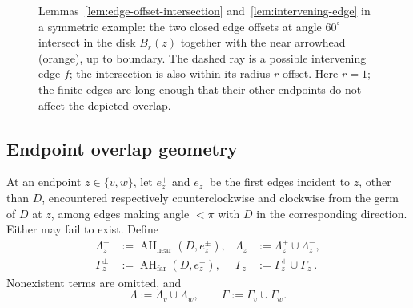 \documentclass[11pt]{article}
\newcommand{\AHfar}{\operatorname{AH}_{\mathrm{far}}}
\newcommand{\AHnear}{\operatorname{AH}_{\mathrm{near}}}
\numberwithin{equation}{section}
\begin{document}
\begin{figure}[!htbp]
\centering
{}
\caption{Lemmas~\ref{lem:edge-offset-intersection} and~\ref{lem:intervening-edge} in a symmetric example: the two closed edge offsets at angle $60^\circ$ intersect in the disk $B_r(z)$ together with the near arrowhead (orange), up to boundary. The dashed ray is a possible intervening edge $f$; the intersection is also within its radius-$r$ offset. Here $r=1$; the finite edges are long enough that their other endpoints do not affect the depicted overlap.}
\label{fig:edge-offset-intersection}
\end{figure}

\subsection{Endpoint overlap geometry}

At an endpoint $z\in\{v,w\}$, let $e_z^+$ and $e_z^-$ be the first edges incident to $z$, other than $D$, encountered respectively counterclockwise and clockwise from the germ of $D$ at $z$, among edges making angle $<\pi$ with $D$ in the corresponding direction. Either may fail to exist. Define
\begin{align*}
\Lambda_z^\pm&:=\AHnear(D,e_z^\pm),
&\Lambda_z&:=\Lambda_z^+\cup\Lambda_z^-,\\
\Gamma_z^\pm&:=\AHfar(D,e_z^\pm),
&\Gamma_z&:=\Gamma_z^+\cup\Gamma_z^-.
\end{align*}
Nonexistent terms are omitted, and
\[
\Lambda:=\Lambda_v\cup\Lambda_w,
\qquad
\Gamma:=\Gamma_v\cup\Gamma_w.
\]
\end{document}
